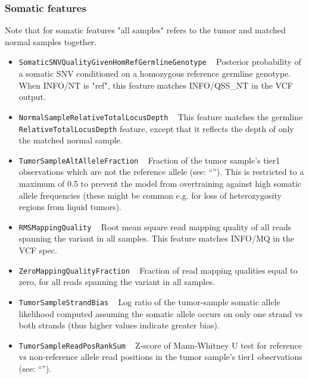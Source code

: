 \documentclass{article}
\begin{document}
\subsubsection{Somatic features}

Note that for somatic features "all samples" refers to the tumor and matched normal samples together.

\begin{itemize}

    \item \texttt{SomaticSNVQualityGivenHomRefGermlineGenotype} ~ Posterior probability of a somatic SNV conditioned on a homozygous reference germline genotype. When INFO/NT is "ref", this feature matches INFO/QSS\_NT in the VCF output.

    \item \texttt{NormalSampleRelativeTotalLocusDepth} ~ This feature matches the germline \texttt{RelativeTotalLocusDepth} feature, except that it reflects the depth of only the matched normal sample.

    \item \texttt{TumorSampleAltAlleleFraction} ~ Fraction of the tumor sample's tier1 observations which are not the reference allele (see: ``''). This is restricted to a maximum of 0.5 to prevent the model from overtraining against high somatic allele frequencies (these might be common e.g. for loss of heterozygosity regions from liquid tumors).

    \item \texttt{RMSMappingQuality} ~ Root mean square read mapping quality of all reads spanning the variant in all samples. This feature matches INFO/MQ in the VCF spec.

    \item \texttt{ZeroMappingQualityFraction} ~ Fraction of read mapping qualities equal to zero, for all reads spanning the variant in all samples.

    \item \texttt{TumorSampleStrandBias} ~ Log ratio of the tumor-sample somatic allele likelihood computed assuming the somatic allele occurs on only one strand vs both strands
    (thus higher values indicate greater bias).

    \item \texttt{TumorSampleReadPosRankSum} ~ Z-score of Mann-Whitney U test for reference vs non-reference allele read positions in the tumor sample's tier1 observations (see: ``'').


\end{itemize}
\end{document}
